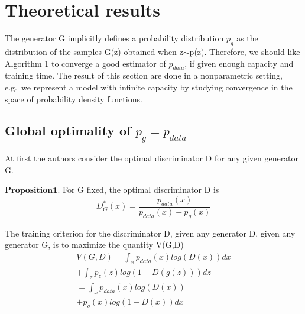 \documentclass[10pt,twocolumn,letterpaper]{article}
\begin{document}
\section{Theoretical results}
\par The generator G implicitly defines a probability distribution $p_{g}$ as the distribution of the samples G(z) obtained when z$\sim$p(z). Therefore, we should like Algorithm 1 to converge a good estimator of $p_{data}$, if given enough capacity and training time. The result of this section are done in a nonparametric setting, e.g.\ we represent a model with infinite capacity by studying convergence in the space of probability density functions.
\subsection{Global optimality of $p_{g}=p_{data}$}
\par At first the authors consider the optimal discriminator D for any given generator G.
\par $\mathbf{Proposition 1.}$ For G fixed, the optimal discriminator D is
\begin{equation}
D_{G}^{*}(x)=\frac{p_{data}(x)}{p_{data}(x)+p_{g}(x)}
\end{equation}
\par The training criterion for the discriminator D, given any generator D, given any generator G, is to maximize the quantity V(G,D)
\begin{equation}
\begin{split}
V(G,D)=\int_{x}p_{data}(x)log(D(x))dx\\
+\int_{z}p_{z}(z)log(1-D(g(z)))dz\\
=\int_{x}p_{data}(x)log(D(x))\\
+p_{g}(x)log(1-D(x))dx
\end{split}
\end{equation}
  
 
\end{document}
